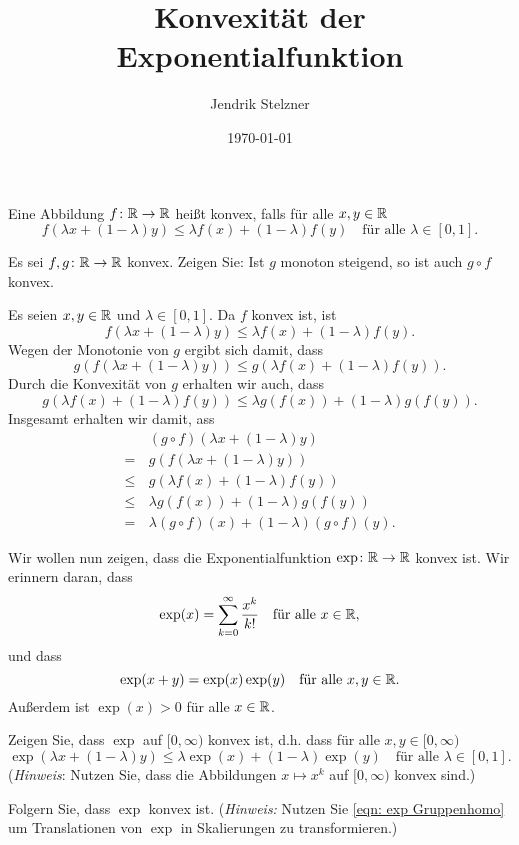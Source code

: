 \documentclass[a4paper,10pt]{article}
\title{Konvexität der Exponentialfunktion}
\author{Jendrik Stelzner}
\date{\today}
\begin{document}
\maketitle


\begin{defi}
 Eine Abbildung $f \colon \mathbb{R} \to \mathbb{R}$ heißt konvex, falls für alle $x,y \in \mathbb{R}$
 \[
  f(\lambda x + (1-\lambda)y) \leq \lambda f(x) + (1-\lambda) f(y)
  \quad \text{für alle $\lambda \in [0,1]$}.
 \]
\end{defi}


\begin{question}
 Es sei $f, g \colon \mathbb{R} \to \mathbb{R}$ konvex. Zeigen Sie: Ist $g$ monoton steigend, so ist auch $g \circ f$ konvex.
\end{question}
\begin{solution}
 Es seien $x,y \in \mathbb{R}$ und $\lambda \in [0,1]$. Da $f$ konvex ist, ist
 \[
  f(\lambda x + (1-\lambda)y) \leq \lambda f(x) + (1-\lambda) f(y).
 \]
 Wegen der Monotonie von $g$ ergibt sich damit, dass
 \[
  g(f(\lambda x + (1-\lambda)y)) \leq g(\lambda f(x) + (1-\lambda) f(y)).
 \]
 Durch die Konvexität von $g$ erhalten wir auch, dass
 \[
  g(\lambda f(x) + (1-\lambda) f(y))
  \leq \lambda g(f(x)) + (1-\lambda) g(f(y)).
 \]
 Insgesamt erhalten wir damit, ass
 \begin{align*}
      &\, (g \circ f)(\lambda x + (1-\lambda) y) \\
     =&\, g(f(\lambda x + (1-\lambda) y)) \\
  \leq&\, g(\lambda f(x) + (1-\lambda) f(y)) \\
  \leq&\, \lambda g(f(x)) + (1-\lambda) g(f(y)) \\
     =&\, \lambda (g \circ f)(x) + (1-\lambda) (g \circ f)(y).
 \end{align*}
\end{solution}


Wir wollen nun zeigen, dass die Exponentialfunktion $\exp \colon \mathbb{R} \to \mathbb{R}$ konvex ist. Wir erinnern daran, dass
\[
 \exp(x) = \sum_{k=0}^\infty \frac{x^k}{k!} \quad \text{für alle $x \in \mathbb{R}$},
\]
und dass
\begin{equation}\label{eqn: exp Gruppenhomo}
 \exp(x+y) = \exp(x) \exp(y) \quad \text{für alle $x,y \in \mathbb{R}$}.
\end{equation}
Außerdem ist $\exp(x) > 0$ für alle $x \in \mathbb{R}$.


\begin{question}
 Zeigen Sie, dass $\exp$ auf $[0,\infty)$ konvex ist, d.h. dass für alle $x,y \in [0,\infty)$
 \[
  \exp(\lambda x + (1-\lambda) y)
  \leq \lambda \exp(x) + (1-\lambda) \exp(y)
  \quad
  \text{für alle $\lambda \in [0,1]$}.
 \]
 (\emph{Hinweis}: Nutzen Sie, dass die Abbildungen $x \mapsto x^k$ auf $[0,\infty)$ konvex sind.)
\end{question}


\begin{question}
 Folgern Sie, dass $\exp$ konvex ist. (\emph{Hinweis:} Nutzen Sie \eqref{eqn: exp Gruppenhomo} um Translationen von $\exp$ in Skalierungen zu transformieren.)
\end{question}






\newpage


\printsolutions
\end{document}

